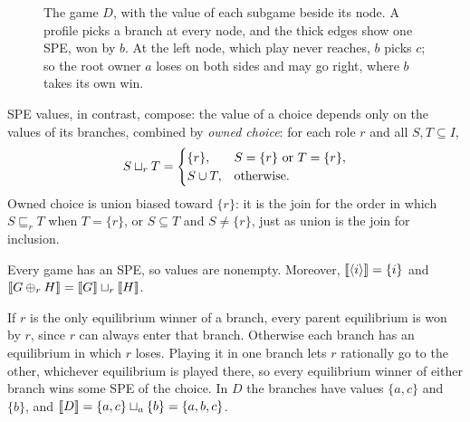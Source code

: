 \begin{figure}[htb]
\centering
{}
\caption{The game $D$, with the value of each subgame beside its node. A profile picks a branch at every node, and the thick edges show one SPE, won by $b$. At the left node, which play never reaches, $b$ picks $c$; so the root owner $a$ loses on both sides and may go right, where $b$ takes its own win.}
\label{fig:D}
\end{figure}

SPE values, in contrast, compose: the value of a choice depends only on the values of its branches, combined by \emph{owned choice}: for each role $r$ and all $S,T\subseteq I$,
\begin{equation}\label{game:eq:own}
 S\mathbin{\sqcup_{r}} T=\begin{cases}
 \{r\},&S=\{r\}\text{ or }T=\{r\},\\
 S\cup T,&\text{otherwise}.
 \end{cases}
\end{equation}
Owned choice is union biased toward $\{r\}$: it is the join for the order in which $S\sqsubseteq_r T$ when $T=\{r\}$, or $S\subseteq T$ and $S\ne\{r\}$, just as union is the join for inclusion.

\begin{proposition}\label{game:thm:adequacy}
Every game has an SPE, so values are nonempty. Moreover,
$\llbracket \langle i\rangle\rrbracket=\{i\}$ and $\llbracket G\mathbin{\oplus_{r}} H\rrbracket=\llbracket G\rrbracket\mathbin{\sqcup_{r}}\llbracket H\rrbracket$.
\end{proposition}

\begin{idea}
If $r$ is the only equilibrium winner of a branch, every parent equilibrium is won by $r$, since $r$ can always enter that branch. Otherwise each branch has an equilibrium in which $r$ loses. Playing it in one branch lets $r$ rationally go to the other, whichever equilibrium is played there, so every equilibrium winner of either branch wins some SPE of the choice. In $D$ the branches have values $\{a,c\}$ and $\{b\}$, and $\llbracket D\rrbracket=\{a,c\}\mathbin{\sqcup_{a}}\{b\}=\{a,b,c\}$.
\end{idea}


